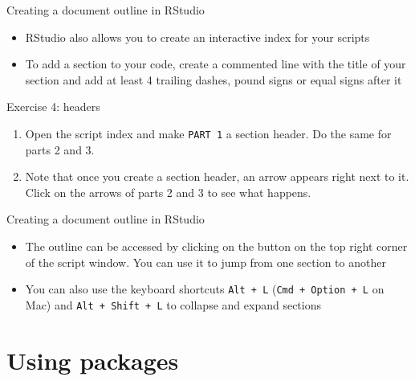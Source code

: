 \documentclass[ignorenonframetext,]{beamer}
\providecommand{\tightlist}{%
  \setlength{\itemsep}{0pt}\setlength{\parskip}{0pt}}
\begin{document}
\begin{frame}[fragile]{Creating a document outline in RStudio}

\begin{itemize}
\tightlist
\item
  RStudio also allows you to create an interactive index for your
  scripts
\item
  To add a section to your code, create a commented line with the title
  of your section and add at least 4 trailing dashes, pound signs or
  equal signs after it
\end{itemize}

\begin{block}{Exercise 4: headers}

\begin{enumerate}
\def\labelenumi{\arabic{enumi}.}
\item
  Open the script index and make \texttt{PART\ 1} a section header. Do
  the same for parts 2 and 3.
\item
  Note that once you create a section header, an arrow appears right
  next to it. Click on the arrows of parts 2 and 3 to see what happens.
\end{enumerate}

\end{block}

\end{frame}

\begin{frame}[fragile]{Creating a document outline in RStudio}

\begin{itemize}
\tightlist
\item
  The outline can be accessed by clicking on the button on the top right
  corner of the script window. You can use it to jump from one section
  to another
\item
  You can also use the keyboard shortcuts \texttt{Alt\ +\ L}
  (\texttt{Cmd\ +\ Option\ +\ L} on Mac) and
  \texttt{Alt\ +\ Shift\ +\ L} to collapse and expand sections
\end{itemize}

\end{frame}

\section{Using packages}\label{using-packages}
\end{document}

